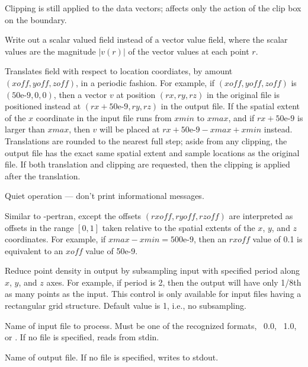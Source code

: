 \begin{description}
  Clipping is still applied to the data vectors;  affects
  only the action of the clip box on the boundary.
\item[\optkey{-mag}]
  Write out a scalar valued field instead of a vector value field, where
  the scalar values are the magnitude $|v(r)|$ of the vector values at
  each point $r$.
\item[\optkey{-pertran xoff yoff zoff}]
  Translates field with respect to location coordiates, by amount
  $(\mathit{xoff},\mathit{yoff},\mathit{zoff})$, in a periodic
  fashion.  For example, if 
  $(\mathit{xoff},\mathit{yoff},\mathit{zoff})$ is $(\mbox{50e-9},0,0)$,
  then a vector $v$ at position
  $(\mathit{rx},\mathit{ry},\mathit{rz})$
  in the original file is positioned instead at
  $(\mathit{rx} + \mbox{50e-9},\mathit{ry},\mathit{rz})$
  in the output file.  If the spatial extent of the
  $x$ coordinate in the input file runs from $\mathit{xmin}$ to
  $\mathit{xmax}$, and if
  $\mathit{rx} +\mbox{50e-9}$ is larger than $\mathit{xmax}$, then $v$
  will be placed at
  $\mathit{rx} + \mbox{50e-9} - \mathit{xmax} + \mathit{xmin}$
  instead.  Translations are rounded to the
  nearest full step; aside from any clipping, the output file has the
  exact same spatial extent and sample locations as the original file.
  If both translation and clipping are requested, then the clipping is
  applied after the translation.
\item[\optkey{-q}]
  Quiet operation --- don't print informational messages.
\item[\optkey{-rpertran rxoff ryoff rzoff}]
  Similar to -pertran, except the offsets
  $(\mathit{rxoff},\mathit{ryoff},\mathit{rzoff})$ are
  interpreted as offsets in the range $[0,1]$ taken relative to the
  spatial extents of the $x$, $y$, and $z$ coordinates.  For example, if
  $\mathit{xmax} - \mathit{xmin} = \mbox{500e-9}$, then an
  $\mathit{rxoff}$ value of 0.1 is equivalent 
  to an $\mathit{xoff}$ value of 50e-9.
\item[\optkey{-subsample period}]
  Reduce point density in output by subsampling input with specified
  period along $x$, $y$, and $z$ axes.  For example, if period is 2,
  then the output will have only 1/8th as many points as the input.
  This control is only available for input files having a rectangular
  grid structure.  Default value is 1, i.e., no subsampling.
\item[\optkey{infile}]
  Name of input file to process.  Must be one of the recognized formats,
  \OVF\ 0.0, \OVF\ 1.0, or \VIO.  If no file is specified, reads from
  stdin.
\item[\optkey{outfile}]
  Name of output file.  If no file is specified, writes to stdout.
\end{description}

